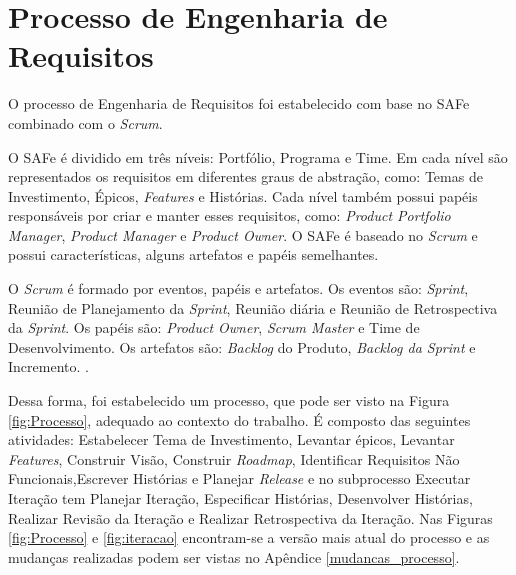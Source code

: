 \chapter[Processo de Engenharia de Requisitos]{Processo de Engenharia de Requisitos}

O processo de Engenharia de Requisitos foi estabelecido com base no SAFe combinado com o \textit{Scrum}.

O SAFe é dividido em três níveis: Portfólio, Programa e Time. Em cada nível são representados os requisitos
em diferentes graus de abstração, como: Temas de Investimento, Épicos, \textit{Features} e Histórias.
Cada nível também possui papéis responsáveis por criar e manter esses requisitos, como: \textit{Product Portfolio Manager}, 
\textit{Product Manager} e \textit{Product Owner}. O SAFe é baseado no \textit{Scrum} e
possui características, alguns artefatos e papéis semelhantes. \cite{safe}

% 

O \textit{Scrum} é formado por eventos, papéis e artefatos. Os eventos são: \textit{Sprint}, Reunião de Planejamento
da \textit{Sprint}, Reunião diária e Reunião de Retrospectiva da \textit{Sprint}. Os papéis são: \textit{Product Owner},
\textit{Scrum Master} e Time de Desenvolvimento. Os artefatos são: \textit{Backlog} do Produto, \textit{Backlog da Sprint} e Incremento. \cite{scrum}.
% 


Dessa forma, foi estabelecido um processo, que pode ser visto na Figura \ref{fig:Processo}, adequado ao contexto do trabalho.
É composto das seguintes atividades: Estabelecer Tema de Investimento, Levantar épicos, Levantar \textit{Features},
Construir Visão, Construir \textit{Roadmap}, Identificar Requisitos Não Funcionais,Escrever
Histórias e Planejar \textit{Release} e no subprocesso Executar Iteração tem Planejar Iteração,
Especificar Histórias, Desenvolver Histórias, Realizar Revisão da Iteraç\~ao e Realizar Retrospectiva da 
Iteração. Nas Figuras \ref{fig:Processo} e \ref{fig:iteracao} encontram-se a versão mais atual do processo e as mudanças realizadas podem ser vistas no Apêndice \ref{mudancas_processo}.

